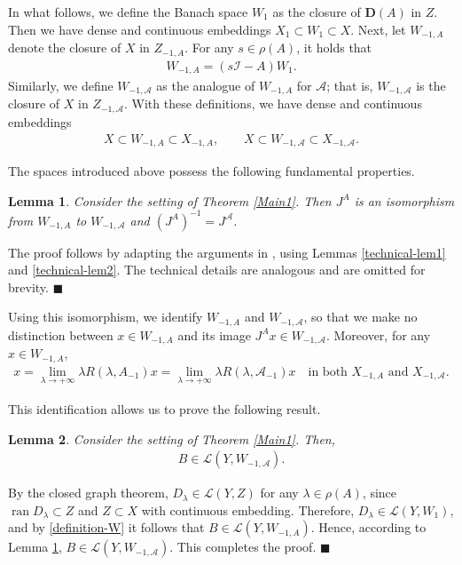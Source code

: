 \documentclass[onecolumn]{autart}
\def\la{\lambda}
\def\calL{{\mathcal{L}}}
\def\calA{{\mathcal{A}}}
\newtheorem{lemma}{Lemma}[section]
\numberwithin{equation}{section}
\newenvironment{proof}{{\it Proof: \enspace}}{\hfill $\blacksquare$\par}
\begin{document}
	In what follows, we define the Banach space $W_1$ as the closure of ${\bm D}(A)$ in $Z$. Then we have dense and continuous embeddings $X_1\subset W_1 \subset X$. Next, let $W_{-1,A}$ denote the closure of $X$ in $Z_{-1,A}$. For any $s\in \rho(A)$, it holds that
	\begin{align}\label{definition-W}
		W_{-1,A}=(s\mathcal{I}-A)W_{1}.
	\end{align}
	Similarly, we define $W_{-1,\calA}$ as the analogue of $W_{-1,A}$ for $\calA$; that is, $W_{-1,\calA}$ is the closure of $X$ in $Z_{-1,\calA}$. With these definitions, we have dense and continuous embeddings
	\begin{align*}
		X\subset W_{-1,A} \subset X_{-1,A},\qquad X\subset W_{-1,\calA} \subset X_{-1,\calA}.
	\end{align*}
	
	The spaces introduced above possess the following fundamental properties.
	\begin{lemma}\label{technical-lem3}
		Consider the setting of Theorem \ref{Main1}. Then $J^A$ is an isomorphism from $W_{-1,A}$ to $W_{-1,\calA}$ and $(J^A)^{-1}=J^\calA$.
	\end{lemma}
	\begin{proof}
		The proof follows by adapting the arguments in \cite[Thm. 7.7]{WF}, using Lemmas \ref{technical-lem1} and \ref{technical-lem2}. The technical details are analogous and are omitted for brevity.
	\end{proof}
	
	Using this isomorphism, we identify $W_{-1,A}$ and $W_{-1,\calA}$, so that we make no distinction between $x\in W_{-1,A}$ and its image $J^A x\in W_{-1,\calA}$. Moreover, for any $x\in W_{-1,A}$,
	\begin{align*}
		x=\lim\limits_{\la\to +\infty} \lambda R(\lambda,A_{-1})x=\lim\limits_{\la\to +\infty} \lambda R(\lambda,\calA_{-1})x\quad \text{in both } X_{-1,A} \text{ and } X_{-1, \calA}.
        \end{align*}
	
     This identification allows us to prove the following result.
     \begin{lemma}\label{echnical-lem4}
		Consider the setting of Theorem \ref{Main1}. Then,
		\begin{align}\label{Boundness-of-B}
			B\in \calL(Y,W_{-1,\calA}).
		\end{align}
	\end{lemma}
	\begin{proof}
		By the closed graph theorem, $D_\la \in \calL(Y, Z)$ for any $\la \in \rho(A)$, since $\operatorname{ran} D_\la\subset Z$ and $Z\subset X$ with continuous embedding. Therefore, $D_\la \in \calL(Y, W_1)$, and by \eqref{definition-W} it follows that $B\in \calL(Y,W_{-1,A})$.  Hence, according to Lemma \ref{technical-lem3}, $B\in \calL(Y,W_{-1,\calA})$. This completes the proof.
	\end{proof}
	
\end{document}
